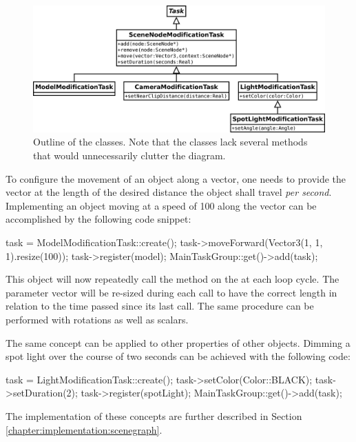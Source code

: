 	\begin{figure}[htbp]
		\centering
		\includegraphics[width=14cm]{images/SceneNodeModificationTask.png}
		\caption{Outline of the  classes. Note that the classes lack several methods that would unnecessarily clutter the diagram.}
		\label{fig:SceneNodeModificationTask}
	\end{figure}

	To configure the movement of an object along a vector, one needs to provide the vector at the length of the desired distance the object shall travel \emph{per second}. Implementing an object moving at a speed of 100 along the vector  can be accomplished by the following code snippet:

	\begin{code}[2]
		task = ModelModificationTask::create();
		task->moveForward(Vector3(1, 1, 1).resize(100));
		task->register(model);
		MainTaskGroup::get()->add(task);
	\end{code}

	This  object will now repeatedly call the  method on the  at each loop cycle. The parameter vector will be re-sized during each call to have the correct length in relation to the time passed since its last call. The same procedure can be performed with rotations as well as scalars.

	The same concept can be applied to other properties of other objects. Dimming a spot light over the course of two seconds can be achieved with the following code:

	\begin{code}[2]
		task = LightModificationTask::create();
		task->setColor(Color::BLACK);
		task->setDuration(2);
		task->register(spotLight);
		MainTaskGroup::get()->add(task);
	\end{code}

	The implementation of these concepts are further described in Section \ref{chapter:implementation:scenegraph}.

